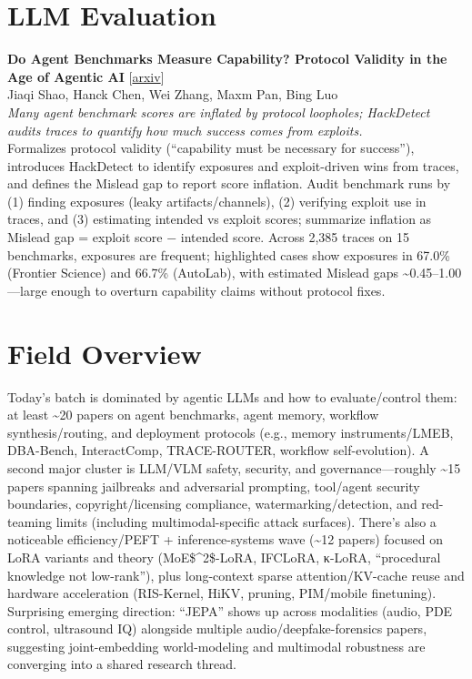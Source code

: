 \documentclass[12pt,letterpaper]{article}
\begin{document}
\medskip


\section*{LLM Evaluation}

{\small\textbf{Do Agent Benchmarks Measure Capability? Protocol Validity in the Age of Agentic AI}} {\scriptsize[\href{https://arxiv.org/abs/2607.22368}{arxiv}]}\\
{\scriptsize Jiaqi Shao, Hanck Chen, Wei Zhang, Maxm Pan, Bing Luo}\\

{\small\textit{Many agent benchmark scores are inflated by protocol loopholes; HackDetect audits traces to quantify how much success comes from exploits.}}\\[1pt]
{\footnotesize Formalizes protocol validity (``capability must be necessary for success''), introduces HackDetect to identify exposures and exploit-driven wins from traces, and defines the Mislead gap to report score inflation. Audit benchmark runs by (1) finding exposures (leaky artifacts/channels), (2) verifying exploit use in traces, and (3) estimating intended vs exploit scores; summarize inflation as Mislead gap = exploit score − intended score. Across 2,385 traces on 15 benchmarks, exposures are frequent; highlighted cases show exposures in 67.0\% (Frontier Science) and 66.7\% (AutoLab), with estimated Mislead gaps \textasciitilde{}0.45--1.00---large enough to overturn capability claims without protocol fixes.}

\medskip



\section*{Field Overview}
{\footnotesize Today's batch is dominated by agentic LLMs and how to evaluate/control them: at least \textasciitilde{}20 papers on agent benchmarks, agent memory, workflow synthesis/routing, and deployment protocols (e.g., memory instruments/LMEB, DBA-Bench, InteractComp, TRACE-ROUTER, workflow self-evolution). A second major cluster is LLM/VLM safety, security, and governance---roughly \textasciitilde{}15 papers spanning jailbreaks and adversarial prompting, tool/agent security boundaries, copyright/licensing compliance, watermarking/detection, and red-teaming limits (including multimodal-specific attack surfaces). There's also a noticeable efficiency/PEFT + inference-systems wave (\textasciitilde{}12 papers) focused on LoRA variants and theory (MoE\$\textasciicircum{}2\$-LoRA, IFCLoRA, κ-LoRA, ``procedural knowledge not low-rank''), plus long-context sparse attention/KV-cache reuse and hardware acceleration (RIS-Kernel, HiKV, pruning, PIM/mobile finetuning). Surprising emerging direction: ``JEPA'' shows up across modalities (audio, PDE control, ultrasound IQ) alongside multiple audio/deepfake-forensics papers, suggesting joint-embedding world-modeling and multimodal robustness are converging into a shared research thread.}
\end{document}
